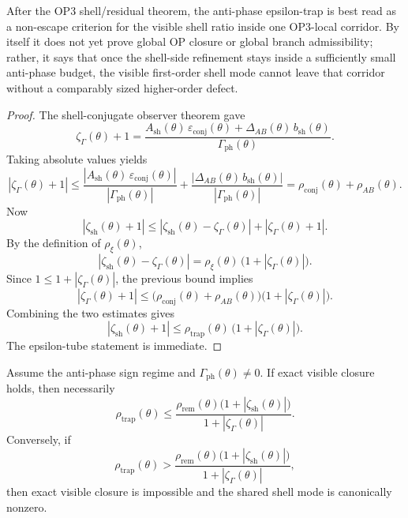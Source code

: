 \begin{remark}
After the OP3 shell/residual theorem, the anti-phase epsilon-trap is best read as a non-escape criterion for the visible shell ratio inside one OP3-local corridor. By itself it does not yet prove global OP closure or global branch admissibility; rather, it says that once the shell-side refinement stays inside a sufficiently small anti-phase budget, the visible first-order shell mode cannot leave that corridor without a comparably sized higher-order defect.
\end{remark}

\begin{proof}
The shell-conjugate observer theorem gave
\[
  \zeta_{\Gamma}(\theta)+1
  =
  \frac{A_{\mathrm{sh}}(\theta)\,\varepsilon_{\mathrm{conj}}(\theta)
   +\Delta_{AB}(\theta)\,b_{\mathrm{sh}}(\theta)}{\Gamma_{\mathrm{ph}}(\theta)}.
\]
Taking absolute values yields
\[
  |\zeta_{\Gamma}(\theta)+1|
  \le
  \frac{|A_{\mathrm{sh}}(\theta)\,\varepsilon_{\mathrm{conj}}(\theta)|}{|\Gamma_{\mathrm{ph}}(\theta)|}
  +
  \frac{|\Delta_{AB}(\theta)\,b_{\mathrm{sh}}(\theta)|}{|\Gamma_{\mathrm{ph}}(\theta)|}
  =
  \rho_{\mathrm{conj}}(\theta)+\rho_{AB}(\theta).
\]
Now
\[
  |\zeta_{\mathrm{sh}}(\theta)+1|
  \le
  |\zeta_{\mathrm{sh}}(\theta)-\zeta_{\Gamma}(\theta)|
  +
  |\zeta_{\Gamma}(\theta)+1|.
\]
By the definition of $\rho_{\xi}(\theta)$,
\[
  |\zeta_{\mathrm{sh}}(\theta)-\zeta_{\Gamma}(\theta)|
  =
  \rho_{\xi}(\theta)\,\bigl(1+|\zeta_{\Gamma}(\theta)|\bigr).
\]
Since $1\le 1+|\zeta_{\Gamma}(\theta)|$, the previous bound implies
\[
  |\zeta_{\Gamma}(\theta)+1|
  \le
  \bigl(\rho_{\mathrm{conj}}(\theta)+\rho_{AB}(\theta)\bigr)
  \bigl(1+|\zeta_{\Gamma}(\theta)|\bigr).
\]
Combining the two estimates gives
\[
  |\zeta_{\mathrm{sh}}(\theta)+1|
  \le
  \rho_{\mathrm{trap}}(\theta)\,\bigl(1+|\zeta_{\Gamma}(\theta)|\bigr).
\]
The epsilon-tube statement is immediate.
\end{proof}

\begin{corollary}
Assume the anti-phase sign regime and $\Gamma_{\mathrm{ph}}(\theta)\neq 0$. If exact visible closure holds, then necessarily
\[
  \rho_{\mathrm{trap}}(\theta)
  \le
  \frac{\rho_{\mathrm{rem}}(\theta)
  \bigl(1+|\zeta_{\mathrm{sh}}(\theta)|\bigr)}{1+|\zeta_{\Gamma}(\theta)|}.
\]
Conversely, if
\[
  \rho_{\mathrm{trap}}(\theta)
  >
  \frac{\rho_{\mathrm{rem}}(\theta)
  \bigl(1+|\zeta_{\mathrm{sh}}(\theta)|\bigr)}{1+|\zeta_{\Gamma}(\theta)|},
\]
then exact visible closure is impossible and the shared shell mode is canonically nonzero.
\end{corollary}

